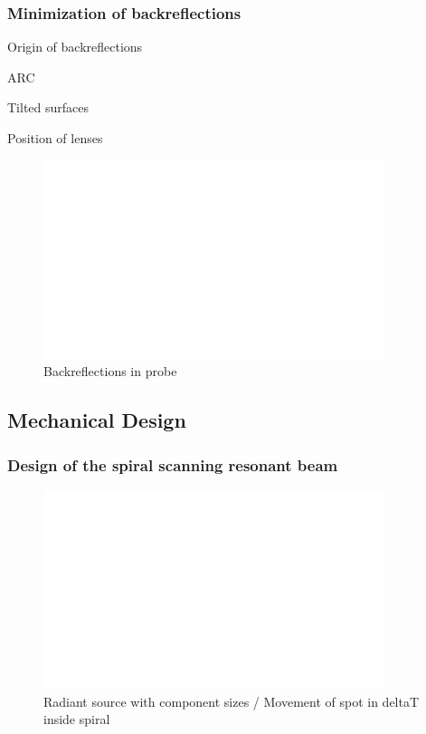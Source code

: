 \subsubsection{Minimization of backreflections}
Origin of backreflections

ARC

Tilted surfaces

Position of lenses

\begin{figure}[h!]\centering \includegraphics[width=10cm,draft]{figures/foo.png}
      \caption{Backreflections in probe}
\end{figure}



\newpage
\subsection{Mechanical Design}

\subsubsection{Design of the spiral scanning resonant beam}

\begin{figure}[h!]\centering \includegraphics[width=10cm,draft]{figures/foo.png}
      \caption{Radiant source with component sizes / Movement of spot in deltaT inside spiral}
\end{figure}

